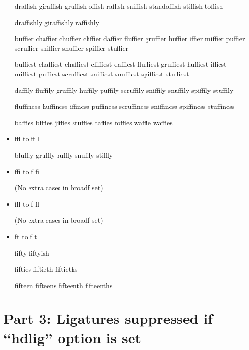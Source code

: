 \begin{itemize}
draffish giraffish gruffish offish raffish sniffish standoffish stiffish toffish

draffishly giraffishly raffishly

buffier chaffier chuffier cliffier daffier fluffier gruffier huffier iffier miffier puffier scruffier sniffier snuffier spiffier stuffier

buffiest chaffiest chuffiest cliffiest daffiest fluffiest gruffiest huffiest iffiest miffiest puffiest scruffiest sniffiest snuffiest spiffiest stuffiest

daffily fluffily gruffily huffily puffily scruffily sniffily snuffily spiffily stuffily

fluffiness huffiness iffiness puffiness scruffiness sniffiness spiffiness stuffiness

baffies biffies jiffies stuffies taffies toffies waffie waffies


\item ffl to ff\kern0pt l

bluffly gruffly ruffly snuffly stiffly


\item ffi to f\kern0pt fi

(No extra cases in broadf set)


\item ffl to f\kern0pt fl

(No extra cases in broadf set)


\item ft to f\kern0pt t

fifty fiftyish

fifties fiftieth fiftieths

fifteen fifteens fifteenth fifteenths



\end{itemize}


\section*{Part 3: Ligatures suppressed if ``hdlig'' option is set}

